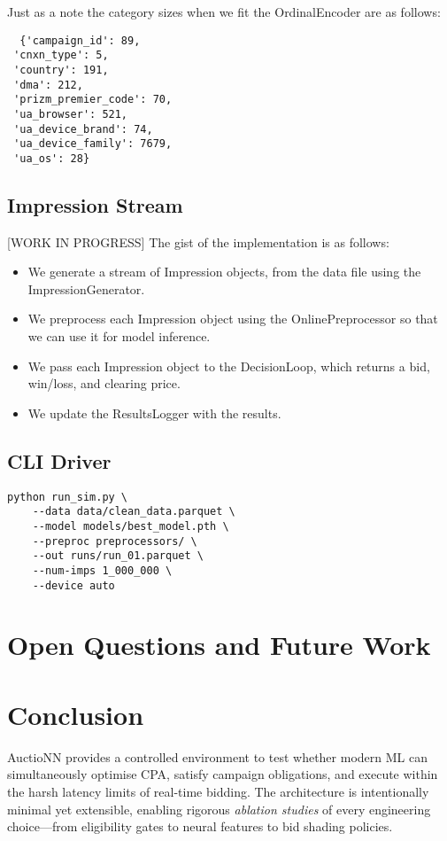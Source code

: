 \documentclass[11pt]{article}
\begin{document}
Just as a note the category sizes when we fit the OrdinalEncoder are as follows:
\begin{verbatim}
  {'campaign_id': 89,
 'cnxn_type': 5,
 'country': 191,
 'dma': 212,
 'prizm_premier_code': 70,
 'ua_browser': 521,
 'ua_device_brand': 74,
 'ua_device_family': 7679,
 'ua_os': 28}
\end{verbatim}

\subsection{Impression Stream}
[WORK IN PROGRESS]
The gist of the implementation is as follows:
\begin{itemize}
  \item We generate a stream of Impression objects, from the data file using the ImpressionGenerator.
  \item We preprocess each Impression object using the OnlinePreprocessor so that we can use it for model inference.
  \item We pass each Impression object to the DecisionLoop, which returns a bid, win/loss, and clearing price.
  \item We update the ResultsLogger with the results.
\end{itemize}

\subsection{CLI Driver}

\begin{verbatim}
python run_sim.py \
    --data data/clean_data.parquet \
    --model models/best_model.pth \
    --preproc preprocessors/ \
    --out runs/run_01.parquet \
    --num-imps 1_000_000 \
    --device auto
\end{verbatim}


\section{Open Questions and Future Work}\label{sec:openq}

\section{Conclusion}
AuctioNN provides a controlled environment to test whether modern ML
can simultaneously optimise CPA, satisfy campaign obligations, and
execute within the harsh latency limits of real-time bidding.  The
architecture is intentionally minimal yet extensible, enabling
rigorous \emph{ablation studies} of every engineering choice—from
eligibility gates to neural features to bid shading policies.



\end{document}
